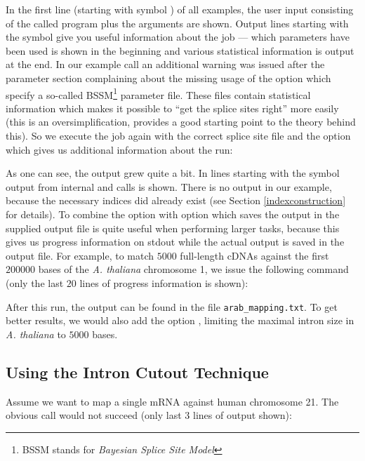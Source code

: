 \documentclass[11pt,a4paper,titlepage]{article}
\begin{document}
In the first line (starting with symbol \texttt{}) of all examples, the
user input consisting of the called program plus the arguments are shown.
Output lines starting with the symbol \texttt{} give you useful information about the job --- which parameters have been used is shown in the beginning and various statistical information is output at the end. In our example call an additional warning was issued after the parameter section complaining about the
missing usage of the option  which specify a so-called
BSSM\footnote{BSSM stands for \emph{Bayesian Splice Site Model}} parameter file. These files contain statistical information which makes it possible to ``get the splice sites right'' more easily (this is an oversimplification, \cite{BRE:XIN:ZHU:2004} provides a good starting point to the theory behind this).
So we execute the job again with the correct splice site file and the option  which gives us additional information about the run:


As one can see, the output grew quite a bit. In lines starting with the symbol
 output from internal \callvmatch and \callmkvtree calls is shown. There
is no \callmkvtree output in our example, because the necessary indices did
already exist (see Section \ref{indexconstruction} for details).
To combine the option  with option 
which saves the output in the supplied output file is quite useful when performing larger tasks, because this gives us progress information on stdout
while the actual output is saved in the output file.
For example, to match $5000$ full-length cDNAs against the first $200000$ bases of the \textit{A. thaliana} chromosome 1, we issue the following command (only the last $20$ lines of progress information is shown):


After this run, the output can be found in the file \texttt{arab\_mapping.txt}.
To get better results, we would also add the option , limiting the maximal intron size in \textit{A. thaliana} to $5000$
bases.

\subsection{Using the Intron Cutout Technique}
Assume we want to map a single mRNA against human chromosome 21.
The obvious call would not succeed (only last $3$ lines of output shown):
\end{document}
